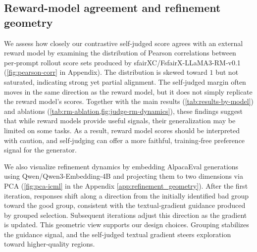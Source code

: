 \documentclass{article}
\theoremstyle{plain}
\theoremstyle{definition}
\theoremstyle{remark}
\begin{document}
\subsection{Reward-model agreement and refinement geometry}
\noindent We assess how closely our contrastive self‑judged score agrees with an external reward model by examining the distribution of Pearson correlations between per‑prompt rollout score sets produced by sfairXC/FsfairX-LLaMA3-RM-v0.1 (\cref{fig:pearson-corr} in Appendix). The distribution is skewed toward \(1\) but not saturated, indicating strong yet partial alignment. The self‑judged margin often moves in the same direction as the reward model, but it does not simply replicate the reward model’s scores. Together with the main results (\cref{tab:results-by-model}) and ablations (\cref{tab:rm-ablation,fig:judge-rm-dynamics}), these findings suggest that while reward models provide useful signals, their generalization may be limited on some tasks. As a result, reward model scores should be interpreted with caution, and self‑judging can offer a more faithful, training‑free preference signal for the generator.



\noindent We also visualize refinement dynamics by embedding AlpacaEval generations using Qwen/Qwen3-Embedding-4B \citep{zhang2025qwen3} and projecting them to two dimensions via PCA \citep{WOLD198737} (\cref{fig:pca-icml} in the Appendix \ref{app:refinement_geometry}). After the first iteration, responses shift along a direction from the initially identified bad group toward the good group, consistent with the textual‑gradient guidance produced by grouped selection. Subsequent iterations adjust this direction as the gradient is updated. This geometric view supports our design choices. Grouping stabilizes the guidance signal, and the self‑judged textual gradient steers exploration toward higher‑quality regions.

\end{document}
